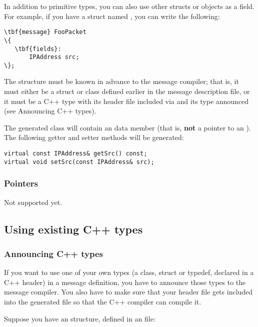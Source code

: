 In addition to primitive types, you can also use other structs or objects
as a field. For example, if you have a struct named ,
you can write the following:

\begin{Verbatim}[commandchars=\\\{\}]
\tbf{message} FooPacket
\{
   \tbf{fields}:
       IPAddress src;
\};
\end{Verbatim}

The  structure must be known in advance to the message compiler;
that is, it must either be a struct or class defined earlier in the message
description file, or it must be a C++ type with its header file
included via  and its type announced
(see Announcing C++ types).

The generated class will contain an  data member
(that is, \textbf{not} a pointer to an ).
The following getter and setter methods will be generated:

\begin{verbatim}
virtual const IPAddress& getSrc() const;
virtual void setSrc(const IPAddress& src);
\end{verbatim}


\subsubsection{Pointers}

Not supported yet.



\subsection{Using existing C++ types}


\subsubsection{Announcing C++ types}

If you want to use one of your own types (a class, struct or typedef,
declared in a C++ header) in a message definition, you have to
announce those types to the message compiler. You also have to make sure
that your header file gets included into the generated  file
so that the C++ compiler can compile it.

Suppose you have an  structure, defined in an 
file:

